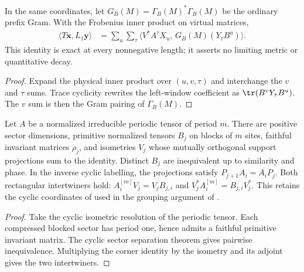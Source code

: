 \begin{lemma}
    \label{thm:residual_window_mixed_gram}
    \leanok
    In the same coordinates, let $G_B(M)=\Gamma_B(M)^*\Gamma_B(M)$ be the
    ordinary prefix Gram. With the Frobenius inner product on virtual matrices,
    \begin{align}
        \langle T\mathbf x,L_1\mathbf y\rangle
         & =\sum_u\sum_\tau
        \big\langle V^*A^\tau X_u,\,
        G_B(M)(Y_\tau B^u)\big\rangle.
        \label{eq:ph_residual_mixed_gram}
    \end{align}
    This identity is exact at every nonnegative length; it asserts no limiting
    metric or quantitative decay.
\end{lemma}
\begin{proof}\leanok
    Expand the physical inner product over $(u,v,\tau)$ and interchange the
    $v$ and $\tau$ sums. Trace cyclicity rewrites the left-window coefficient
    as $\tr(B^vY_\tau B^u)$. The $v$ sum is then the Gram pairing of
    $\Gamma_B(M)$.
\end{proof}

\begin{lemma}
    \label{thm:cyclic_primitive_sector_resolution}
    \leanok
    Let $A$ be a normalized irreducible periodic tensor of period $m$.
    There are positive sector dimensions, primitive normalized tensors $B_j$
    on blocks of $m$ sites, faithful invariant matrices $\rho_j$, and isometries
    $V_j$ whose mutually orthogonal support projections sum to the identity.
    Distinct $B_j$ are inequivalent up to similarity and phase. In the inverse
    cyclic labelling, the projections satisfy $P_{j+1}A_i=A_iP_j$.
    Both rectangular intertwiners hold:
    $A^{[m]}_iV_j=V_jB_{j,i}$ and
    $V_j^*A^{[m]}_i=B_{j,i}V_j^*$.
    This retains the cyclic coordinates of
    \cite[Lemma~5]{DeLasCuevas2017Irreducible} used in the grouping argument of
    \cite[Section~6]{Nachtergaele1996Spectral}.
\end{lemma}
\begin{proof}\leanok
    Take the cyclic isometric resolution of the periodic tensor.
    Each compressed blocked sector has period one, hence admits a faithful
    primitive invariant matrix. The cyclic sector separation theorem gives
    pairwise inequivalence. Multiplying the corner identity by the isometry
    and its adjoint gives the two intertwiners.
\end{proof}

